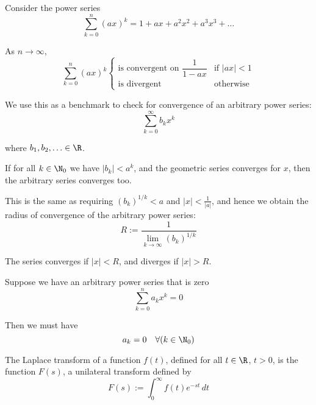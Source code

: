 \label{de785b7}


\label{ea9daf1}

Consider the power series
$$
  \sum_{k=0}^n(ax)^k=1+ax+a^2x^2+a^3x^3+\ldots
$$

As $n\to\infty$,
$$
  \sum_{k=0}^n(ax)^k\begin{cases}
    \text{is convergent on }\dfrac1{1-ax} & \text{if }|ax|<1 \\
    \text{is divergent}                   & \text{otherwise}
  \end{cases}
$$

We use this as a benchmark to check for convergence of an arbitrary power
series:
$$
  \sum_{k=0}^\infty b_kx^k
$$

where $b_1,b_2,\ldots\in\R$.

If for all $k\in\N_0$ we have $|b_k|<a^k$, and the geometric series converges
for $x$, then the arbitrary series converges too.

This is the same as requiring $(b_k)^{1/k}<a$ and $|x|<\frac1{|a|}$, and hence
we obtain the radius of convergence of the arbitrary power series:
$$
  R:=\frac{1}{\displaystyle\lim_{k\to\infty}(b_k)^{1/k}}
$$

The series converges if $|x|<R$, and diverges if $|x|>R$.

\label{fe2e0f1}

Suppose we have an arbitrary power series that is zero
$$
  \sum_{k=0}^na_kx^k = 0
$$

Then we must have
$$
  a_k=0\quad\forall(k\in\N_0)
$$

\label{a7047c9}

The Laplace transform of a function $f(t)$, defined for all $t\in\R$, $t>0$, is
the function $F(s)$, a unilateral transform defined by
$$
  F(s):=\int_0^\infty f(t)e^{-st}\,dt
$$

